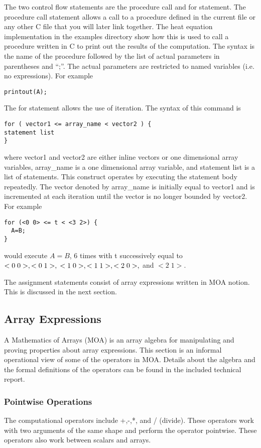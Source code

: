 The two control flow statements are the procedure call and 
for statement.  The procedure call statement allows a call to a procedure 
defined in the current file or any other C file that you will later link 
together.  The heat equation implementation in the examples directory show how 
this is used to call a procedure written in C to print out the results of the
computation.  The syntax is the name of the procedure followed by the list
of actual parameters in parentheses and ``;''.  The actual parameters are
restricted to named variables (i.e. no expressions).  For example
\begin{verbatim}
printout(A);
\end{verbatim}
The for statement allows the use of iteration.  The syntax of this command
is
\begin{verbatim}
for ( vector1 <= array_name < vector2 ) {
statement list
}
\end{verbatim}
where vector1 and vector2 are either inline vectors or one dimensional
array variables, array\_name is a one dimensional array variable, and
statement list is a list of statements.  This construct operates by executing
the statement body repeatedly.  The vector denoted by array\_name is 
initially equal to vector1 and is incremented at each iteration until the
vector is no longer bounded by vector2.  For example
\begin{verbatim}
for (<0 0> <= t < <3 2>) {
  A=B;
}
\end{verbatim}
would execute $A=B$, 6 times with t successively equal to $<0\;0>, <0\;1>,
\newline <1\;0>, <1\;1>, <2\;0>,$ and $<2\;1>$.

The assignment statements consist of array expressions written in 
MOA notion.  This is
discussed in the next section.

\subsection{Array Expressions}
A Mathematics of Arrays (MOA) is an array algebra for manipulating and proving
properties about array expressions.  This section is an informal operational
view of some of the operators in MOA.  Details about the algebra and 
the formal definitions of the operators can be found in the included 
technical report.  
\subsubsection{Pointwise Operations}
The computational operators include +,-,*, and / (divide).
These operators work with two arguments of the same shape and perform the
operator pointwise.  These operators also work between scalars and arrays.
